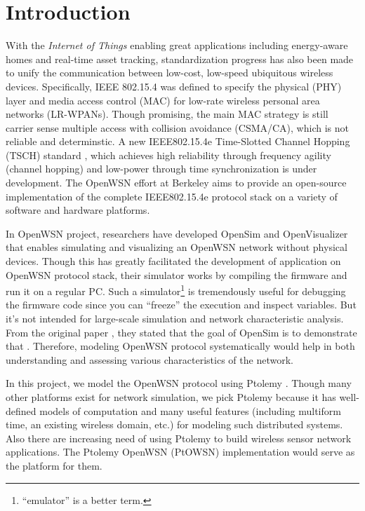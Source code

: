 \section{Introduction}
\label{sec:introduction}

With the {\em Internet of Things} enabling great applications including energy-aware homes and real-time asset tracking, standardization progress has also been made to unify the communication between low-cost, low-speed ubiquitous wireless devices. Specifically, IEEE 802.15.4 \cite{IEEE802.15.4} was defined to specify the physical (PHY) layer and media access control (MAC) for low-rate wireless personal area networks (LR-WPANs). Though promising, the main MAC strategy is still carrier sense multiple access with collision avoidance (CSMA/CA), which is not reliable and determinstic. A new IEEE802.15.4e Time-Slotted Channel Hopping (TSCH) standard \cite{IEEE802.15.4e}, which achieves high reliability through frequency agility (channel hopping) and low-power through time synchronization is under development. The OpenWSN \cite{watteyne2012openwsn} effort at Berkeley aims to provide an open-source implementation of the complete IEEE802.15.4e protocol stack on a variety of software and hardware platforms. 

In OpenWSN project, researchers have developed OpenSim and OpenVisualizer that enables simulating and visualizing an OpenWSN network without physical devices. Though this has greatly facilitated the development of application on OpenWSN protocol stack, their simulator works by compiling the firmware and run it on a regular PC. Such a simulator\footnote{ ``emulator'' is a better term.} is tremendously useful for debugging the firmware code since you can ``freeze'' the execution and inspect variables. But it's not intended for large-scale simulation and network characteristic analysis. From the original paper \cite{watteyne2012openwsn}, they stated that the goal of OpenSim is to demonstrate that .  Therefore, modeling OpenWSN protocol systematically would help in both understanding and assessing various characteristics of the network. 

In this project, we model the OpenWSN protocol using Ptolemy \cite{PtolemyVol1:04, davis1999overview}. Though many other platforms \cite{mccanne1995ns, varga2001omnet++} exist for network simulation, we pick Ptolemy because it has well-defined models of computation and many useful features (including multiform time, an existing wireless domain, etc.) for modeling such distributed systems. Also there are increasing need of using Ptolemy to build wireless sensor network applications. The Ptolemy OpenWSN (PtOWSN) implementation would serve as the platform for them. 


